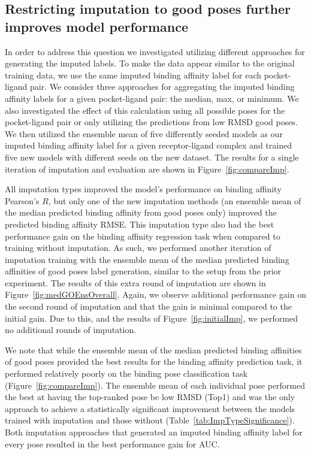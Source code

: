 \documentclass[journal=jcim,manuscript=article]{achemso}
\begin{document}
\subsection{Restricting imputation to good poses further improves model performance}
In order to address this question we investigated utilizing different approaches for generating the imputed labels.
To make the data appear similar to the original training data, we use the same imputed binding affinity label for each pocket-ligand pair.
We consider three approaches for aggregating the imputed binding affinity labels for a given pocket-ligand pair: the median, max, or minimum.
We also investigated the effect of this calculation using all possible poses for the pocket-ligand pair or only utilizing the predictions from low RMSD good poses.
We then utilized the ensemble mean of five differently seeded models as our imputed binding affinity label for a given receptor-ligand complex and trained five new models with different seeds on the new dataset.
The results for a single iteration of imputation and evaluation are shown in Figure~\ref{fig:compareImp}.

All imputation types improved the model's performance on binding affinity Pearson's $R$, but only one of the new imputation methods (an ensemble mean of the median predicted binding affinity from good poses only) improved the predicted binding affinity RMSE.
This imputation type also had the best performance gain on the binding affinity regression task when compared to training without imputation.
As such, we performed another iteration of imputation training with the ensemble mean of the median predicted binding affinities of good poses label generation, similar to the setup from the prior experiment.
The results of this extra round of imputation are shown in Figure~\ref{fig:medGOEnsOverall}.
Again, we observe additional performance gain on the second round of imputation and that the gain is minimal compared to the initial gain.
Due to this, and the results of Figure~\ref{fig:initialImp}, we performed no additional rounds of imputation.

We note that while the ensemble mean of the median predicted binding affinities of good poses provided the best results for the binding affinity prediction task, it performed relatively poorly on the binding pose classification task (Figure~\ref{fig:compareImp}).
The ensemble mean of each individual pose performed the best at having the top-ranked pose be low RMSD (Top1) and was the only approach to achieve a statistically significant improvement between the models trained with imputation and those without (Table~\ref{tab:ImpTypeSignificance}).
Both imputation approaches that generated an imputed binding affinity label for every pose resulted in the best performance gain for AUC.
\end{document}
